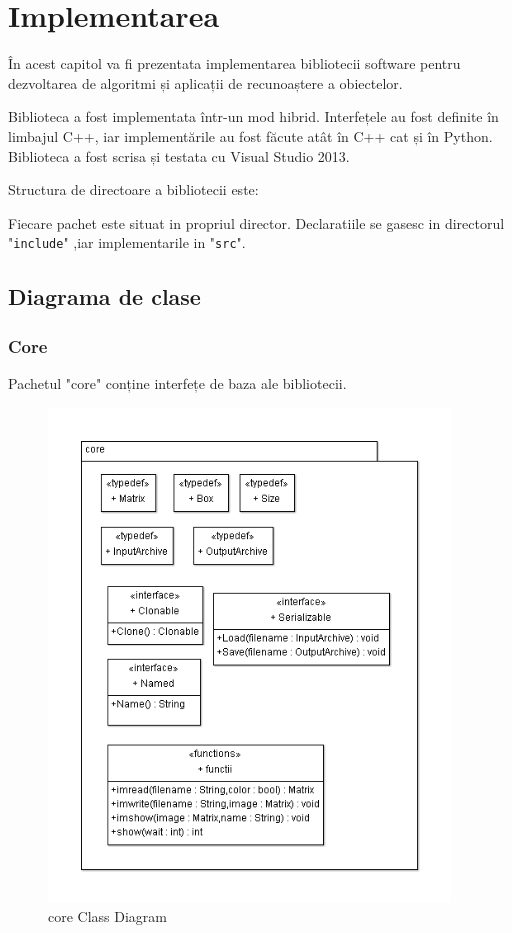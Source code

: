 \chapter{Implementarea}

În acest capitol va fi prezentata implementarea bibliotecii software pentru dezvoltarea de algoritmi și aplicații de recunoaștere a obiectelor.

Biblioteca a fost implementata într-un mod hibrid.
Interfețele au fost definite în limbajul C++, iar implementările au fost făcute atât în C++ cat și în Python.
Biblioteca a fost scrisa și testata cu Visual Studio 2013.


Structura de directoare a bibliotecii este:

Fiecare pachet este situat in propriul director.
Declaratiile se gasesc in directorul "\verb!include!"
,iar implementarile in "\verb!src!".



\pagebreak
\section{Diagrama de clase}

\subsection{Core}
Pachetul "core" conține interfețe de baza ale bibliotecii.
\begin{figure}[H]
	\centering
		\includegraphics[width=0.95\textwidth]{uml/coreClassDiagram.png}
	\caption{core Class Diagram}
	\label{fig:coreClassDiagram}
\end{figure}


